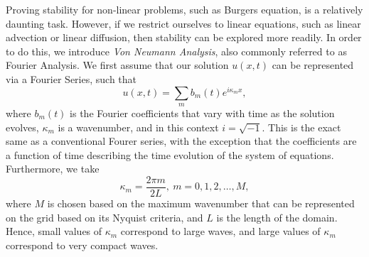 Proving stability for non-linear problems, such as Burgers equation, is a relatively daunting task. However, if we restrict ourselves to linear equations, such as linear advection or linear diffusion, then stability can be explored more readily. In order to do this, we introduce {\it Von Neumann Analysis}, also commonly referred to as Fourier Analysis. We first assume that our solution $u(x,t)$ can be represented via a Fourier Series, such that
\begin{equation}
	u(x,t) = \sum_{m} b_m(t) e^{i \kappa_m x},
\end{equation}
where $b_m(t)$ is the Fourier coefficients that vary with time as the solution evolves, $\kappa_m$ is a wavenumber, and in this context $i = \sqrt{-1}$. This is the exact same as a conventional Fourer series, with the exception that the coefficients are a function of time describing the time evolution of the system of equations. Furthermore, we take
\begin{equation}
	\kappa_m = \frac{2 \pi m}{2 L}, \: m=0,1,2,\hdots,M,
\end{equation}
where $M$ is chosen based on the maximum wavenumber that can be represented on the grid based on its Nyquist criteria, and $L$ is the length of the domain. Hence, small values of $\kappa_m$ correspond to large waves, and large values of $\kappa_m$ correspond to very compact waves.

